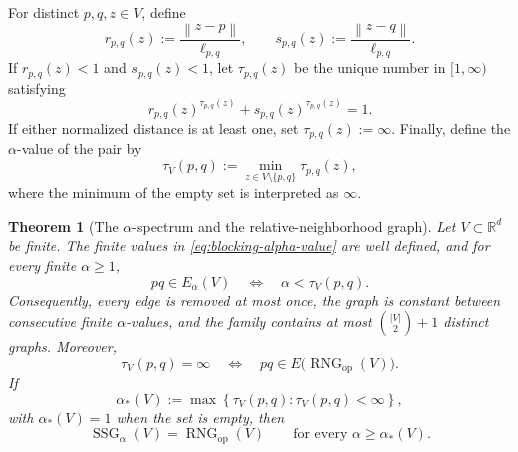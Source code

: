 \documentclass[a4paper,fleqn]{cas-sc}
\newtheorem{theorem}{Theorem}
\theoremstyle{definition}
\theoremstyle{remark}
\newcommand{\R}{\mathds{R}}
\newcommand{\norm}[1]{\left\lVert #1\right\rVert}
\newcommand{\set}[1]{\left\{#1\right\}}
\newcommand{\ellpq}{\ell_{p,q}}
\newcommand{\0}{\mathbf{0}}
\newcommand{\tr}[1]{#1}
\newcommand{\tr}[1]{\textcolor[HTML]{aa0000}{#1}}
\DeclareMathOperator{\SSG}{SSG}
\DeclareMathOperator{\RNG}{RNG}
\begin{document}
\tr{For distinct $p,q,z\in V$, define}
\begin{equation}
\tr{
r_{p,q}(z):=\frac{\norm{z-p}}{\ellpq},
\qquad
s_{p,q}(z):=\frac{\norm{z-q}}{\ellpq}.
}
\end{equation}
\tr{If $r_{p,q}(z)<1$ and $s_{p,q}(z)<1$, let $\tau_{p,q}(z)$ be the unique
number in $[1,\infty)$ satisfying}
\begin{equation}\label{eq:blocking-alpha-value}
\tr{
r_{p,q}(z)^{\tau_{p,q}(z)}
+
s_{p,q}(z)^{\tau_{p,q}(z)}
=1.
}
\end{equation}
\tr{If either normalized distance is at least one, set
$\tau_{p,q}(z):=\infty$. Finally, define the $\alpha$-value of the pair by}
\begin{equation}\label{eq:edge-alpha-value}
\tr{
\tau_V(p,q)
:=
\min_{z\in V\setminus\{p,q\}}\tau_{p,q}(z),
}
\end{equation}
\tr{where the minimum of the empty set is interpreted as $\infty$.}

\begin{theorem}[The $\alpha$-spectrum and the relative-neighborhood graph]
\label{thm:finite-spectrum}
\tr{Let $V\subset\R^d$ be finite. The finite values in
\eqref{eq:blocking-alpha-value} are well defined, and for every finite
$\alpha\geq1$,}
\begin{equation}\label{eq:spectrum-edge-rule}
\tr{
pq\in E_\alpha(V)
\quad\Longleftrightarrow\quad
\alpha<\tau_V(p,q).
}
\end{equation}
\tr{Consequently, every edge is removed at most once, the graph is constant
between consecutive finite $\alpha$-values, and the family contains at most
$\binom{|V|}{2}+1$ distinct graphs. Moreover,}
\begin{equation}
\tr{
\tau_V(p,q)=\infty
\quad\Longleftrightarrow\quad
pq\in E\bigl(\RNG_{\mathrm{op}}(V)\bigr).
}
\end{equation}
\tr{If}
\begin{equation}
\tr{
\alpha_*(V)
:=
\max\set{\tau_V(p,q):\tau_V(p,q)<\infty},
}
\end{equation}
\tr{with $\alpha_*(V)=1$ when the set is empty, then}
\begin{equation}\label{eq:eventual-rng-equality}
\tr{
\SSG_\alpha(V)
=
\RNG_{\mathrm{op}}(V)
\qquad
\text{for every }\alpha\geq\alpha_*(V).
}
\end{equation}
\end{theorem}
\end{document}
